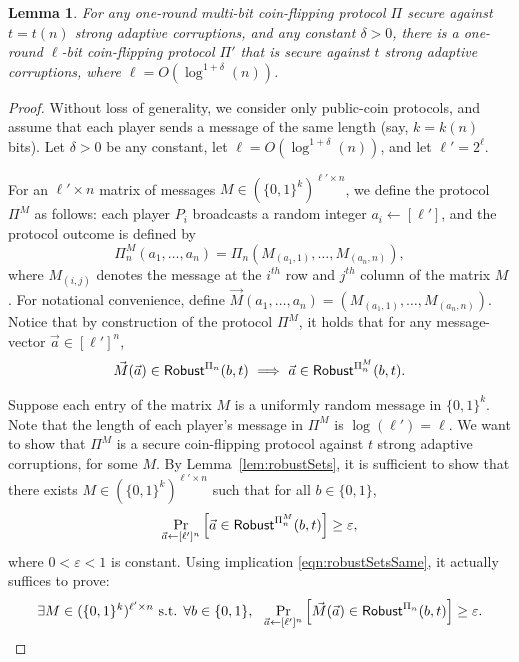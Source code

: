 \documentclass[11pt,letterpaper]{article}
\theoremstyle{plain}
\newtheorem{lemma}[theorem]{Lemma}
\theoremstyle{definition}
\newcommand{\larr}{\leftarrow}
\newcommand{\eps}{\varepsilon}
\begin{document}
\begin{lemma}\label{lem:manyBitsMatrix}
For any one-round multi-bit coin-flipping protocol $\Pi$ secure against $t=t(n)$ strong adaptive corruptions, and any constant $\delta>0$,
there is a one-round $\ell$-bit coin-flipping protocol $\Pi'$ that is secure against $t$ strong adaptive corruptions,
where $\ell=O(\log^{1+\delta}(n))$.
\end{lemma}
\begin{proof}
Without loss of generality, we consider only public-coin protocols,
and assume that each player sends a message of the same length (say, $k=k(n)$ bits).
Let $\delta>0$ be any constant, let $\ell=O(\log^{1+\delta}(n))$, and let $\ell'=2^{\ell}$.

For an $\ell'\times n$ matrix of messages $M\in(\{0,1\}^k)^{\ell'\times n}$, we define the protocol $\Pi^M$ as follows:
each player $P_i$ broadcasts a random integer $a_i\larr[\ell']$, and the protocol outcome is defined by
$$\Pi^M_n(a_1,\dots,a_n) = \Pi_n(M_{(a_1,1)},\dots,M_{(a_n,n)}),$$
where $M_{(i,j)}$ denotes the message at the $i^{th}$ row and $j^{th}$ column of the matrix $M$.
For notational convenience, define $\vec{M}(a_1,\dots,a_n)=(M_{(a_1,1)},\dots,M_{(a_n,n)})$.
Notice that by construction of the protocol $\Pi^M$, it holds that for any message-vector $\vec{a}\in[\ell']^n$,
\begin{align}\label{eqn:robustSetsSame}
\vec{M}(\vec{a})\in{\sf Robust}^{\Pi_n}(b,t) ~\Longrightarrow~ \vec{a}\in{\sf Robust}^{\Pi^M_n}(b,t).
\end{align}

Suppose each entry of the matrix $M$ is a uniformly random message in $\{0,1\}^k$.
Note that the length of each player's message in $\Pi^M$ is $\log(\ell')=\ell$.
We want to show that $\Pi^M$ is a secure coin-flipping protocol against $t$ strong adaptive corruptions, for some $M$.
By Lemma~\ref{lem:robustSets}, it is sufficient to show that there exists $M\in(\{0,1\}^k)^{\ell'\times n}$ such that for all $b\in\{0,1\}$,
\begin{align}\label{eqn:notReallyRandom1}
\Pr_{\vec{a}\larr[\ell']^n}\left[\vec{a}\in\Robust^{\Pi^M_n}(b,t)\right]\geq\eps,
\end{align}
where $0<\eps<1$ is constant.
Using implication \eqref{eqn:robustSetsSame}, it actually suffices to prove:
\begin{align}\label{eqn:notReallyRandom2}
\exists M\in(\{0,1\}^k)^{\ell'\times n} \mbox{ s.t. } \forall b\in\{0,1\},~~
\Pr_{\vec{a}\larr[\ell']^n}\left[\vec{M}(\vec{a})\in\Robust^{\Pi_n}(b,t)\right]\geq\eps.
\end{align}



\end{proof}
\end{document}
